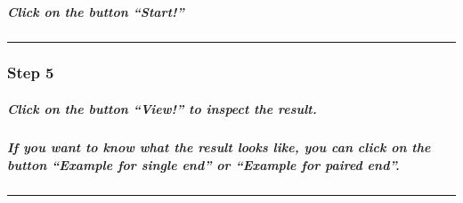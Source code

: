 \documentclass[]{article}
\let\oldsubparagraph\subparagraph
\renewcommand{\subparagraph}[1]{\oldsubparagraph{#1}\mbox{}}
\begin{document}
\hypertarget{click-on-the-button-start}{%
\subparagraph{\texorpdfstring{Click on the button
\textbf{``Start!''}}{Click on the button ``Start!''}}\label{click-on-the-button-start}}

\begin{center}\rule{0.5\linewidth}{\linethickness}\end{center}

\hypertarget{step-5}{%
\subsubsection{Step 5}\label{step-5}}

\hypertarget{click-on-the-button-view-to-inspect-the-result.}{%
\subparagraph{\texorpdfstring{Click on the button \textbf{``View!''} to
inspect the
result.}{Click on the button ``View!'' to inspect the result.}}\label{click-on-the-button-view-to-inspect-the-result.}}

\hypertarget{if-you-want-to-know-what-the-result-looks-like-you-can-click-on-the-button-example-for-single-end-or-example-for-paired-end.}{%
\subparagraph{\texorpdfstring{If you want to know what the result looks
like, you can click on the button \textbf{``Example for single end''} or
\textbf{``Example for paired
end''}.}{If you want to know what the result looks like, you can click on the button ``Example for single end'' or ``Example for paired end''.}}\label{if-you-want-to-know-what-the-result-looks-like-you-can-click-on-the-button-example-for-single-end-or-example-for-paired-end.}}

\begin{center}\rule{0.5\linewidth}{\linethickness}\end{center}
\end{document}
